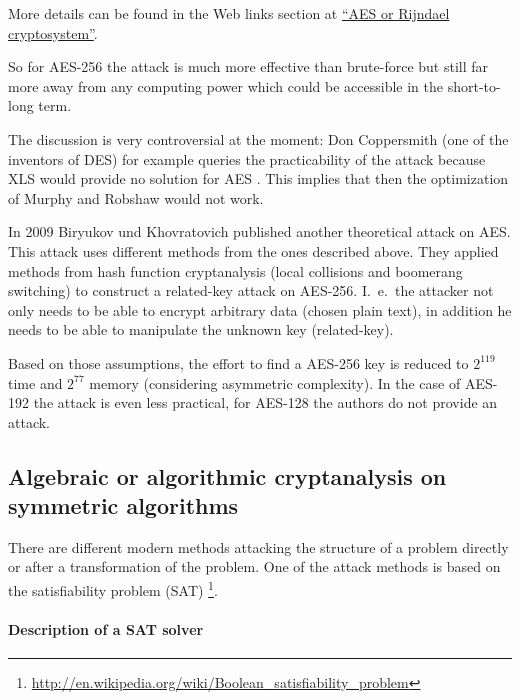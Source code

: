 More details can be found in the Web links section at
\hyperlink{CM_HT_Weblink_Rijndael-Cryptosystem}{``AES or Rijndael cryptosystem''}.

So for AES-256 the attack is much more effective than brute-force but still far more away from any computing power which could be accessible in the short-to-long term. 

The discussion is very controversial at the moment: Don Coppersmith (one of the
inventors of DES) for example queries the practicability of the attack because
XLS would provide no solution for AES \cite{cm:Coppersmith2002}. This implies that
then the optimization of Murphy and Robshaw \cite{cm:Robshaw2002b} would not work.

In 2009 Biryukov und Khovratovich \cite{cm:Biryukov2009} published another
theoretical attack on AES. This attack uses different methods from the ones
described above. They applied methods from hash function cryptanalysis (local
collisions and boomerang switching) to construct a related-key attack on
AES-256. I.~e.\ the attacker not only needs to be able to encrypt arbitrary data
(chosen plain text), in addition he needs to be able to manipulate the unknown key
(related-key). 

Based on those assumptions, the effort to find a AES-256 key is reduced to
$2^{119}$ time and $2^{77}$ memory (considering asymmetric complexity).
In the case of AES-192 the attack is even less practical, for AES-128
the authors do not provide an attack.


\subsection{Algebraic or algorithmic cryptanalysis on symmetric algorithms}
\label{Algebraic-gegen-Symmetr}

There are different modern methods attacking the structure of a problem directly or after a transformation of the problem. One of the attack methods is based on the satisfiability problem (SAT)%
\footnote{%
 \url{http://en.wikipedia.org/wiki/Boolean_satisfiability_problem}
}.


\paragraph*{Description of a SAT solver}\mbox{}
\hypertarget{ht_SAT-Solver}{}

